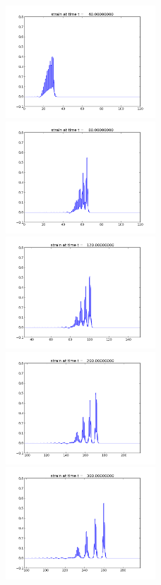 \documentclass{article}
\begin{document}
\begin{figure}
  \includegraphics[width=0.5\textwidth]{frame0004fig1.png}
  \includegraphics[width=0.5\textwidth]{frame0008fig1.png}
  \includegraphics[width=0.5\textwidth]{frame0012fig1.png}
  \includegraphics[width=0.5\textwidth]{frame0020fig1.png}
  \includegraphics[width=0.5\textwidth]{frame0030fig1.png}

\end{figure}
\end{document}
